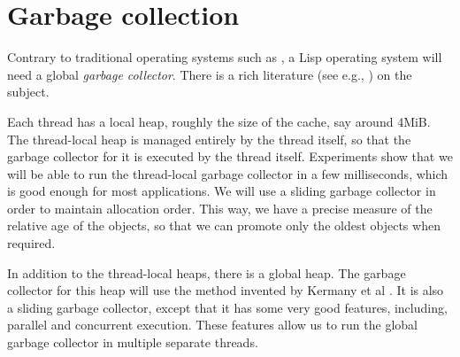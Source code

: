 \chapter{Garbage collection}
\label{chap-garbage-collection}

Contrary to traditional operating systems such as \unix{}, a Lisp
operating system will need a global \emph{garbage collector}.  There 
is a rich literature (see e.g., \cite{Jones:2011:GCH:2025255}) on the
subject. 

Each thread has a local heap, roughly the size of the cache, say
around 4MiB.  The thread-local heap is managed entirely by the thread
itself, so that the garbage collector for it is executed by the thread
itself.  Experiments show that we will be able to run the thread-local
garbage collector in a few milliseconds, which is good enough for most
applications.  We will use a sliding garbage collector in order to
maintain allocation order.  This way, we have a precise measure of the
relative age of the objects, so that we can promote only the oldest
objects when required. 

In addition to the thread-local heaps, there is a global heap.  The
garbage collector for this heap will use the method invented by
Kermany et al \cite{Kermany:2006:CCI:1133981.1134023}.  It is also a
sliding garbage collector, except that it has some very good features,
including, parallel and concurrent execution.  These features allow us
to run the global garbage collector in multiple separate threads. 
